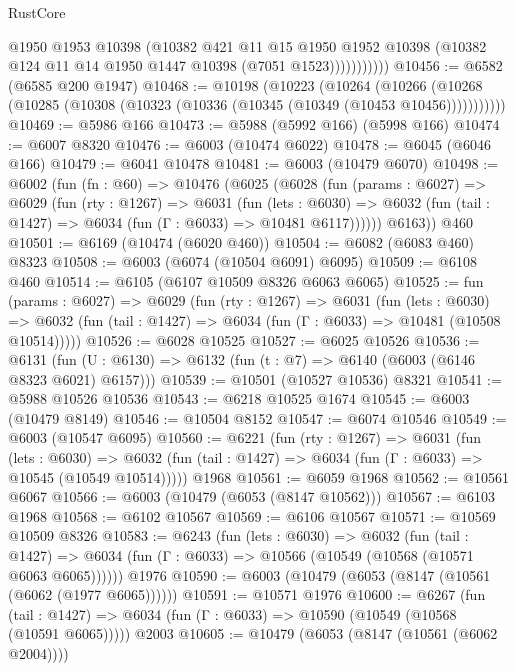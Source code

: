 \begin{lexlean}{RustCore}
\begin{coremodule}
{\begin{coremodule}
{{{{{{{{{{{{{{{{{{{{{{{{{{{{{{{{{{{{{{{{{{{{{{{                    @1950
                    @1953
                    @10398
                    (@10382
                      @421
                      @11
                      @15
                      @1950
                      @1952
                      @10398
                      (@10382 @124 @11 @14 @1950 @1447 @10398 (@7051 @1523)))))))))))
@10456 := @6582 (@6585 @200 @1947)
@10468 := @10198
    (@10223
      (@10264
        (@10266 (@10268 (@10285 (@10308 (@10323 (@10336 (@10345 (@10349 (@10453 @10456)))))))))))
@10469 := @5986 @166
@10473 := @5988 (@5992 @166) (@5998 @166)
@10474 := @6007 @8320
@10476 := @6003 (@10474 @6022)
@10478 := @6045 (@6046 @166)
@10479 := @6041 @10478
@10481 := @6003 (@10479 @6070)
@10498 := @6002
    (fun (fn : @60) =>
    @10476
      (@6025
        (@6028
          (fun (params : @6027) =>
          @6029
            (fun (rty : @1267) =>
            @6031
              (fun (lets : @6030) =>
              @6032 (fun (tail : @1427) => @6034 (fun (Γ : @6033) => @10481 @6117))))))
        @6163))
    @460
@10501 := @6169 (@10474 (@6020 @460))
@10504 := @6082 (@6083 @460) @8323
@10508 := @6003 (@6074 (@10504 @6091) @6095)
@10509 := @6108 @460
@10514 := @6105 (@6107 @10509 @8326 @6063 @6065)
@10525 := fun (params : @6027) =>
  @6029
    (fun (rty : @1267) =>
    @6031
      (fun (lets : @6030) =>
      @6032 (fun (tail : @1427) => @6034 (fun (Γ : @6033) => @10481 (@10508 @10514)))))
@10526 := @6028 @10525
@10527 := @6025 @10526
@10536 := @6131 (fun (U : @6130) => @6132 (fun (t : @7) => @6140 (@6003 (@6146 @8323 @6021) @6157)))
@10539 := @10501 (@10527 @10536) @8321
@10541 := @5988 @10526 @10536
@10543 := @6218 @10525 @1674
@10545 := @6003 (@10479 @8149)
@10546 := @10504 @8152
@10547 := @6074 @10546
@10549 := @6003 (@10547 @6095)
@10560 := @6221
    (fun (rty : @1267) =>
    @6031
      (fun (lets : @6030) =>
      @6032 (fun (tail : @1427) => @6034 (fun (Γ : @6033) => @10545 (@10549 @10514)))))
    @1968
@10561 := @6059 @1968
@10562 := @10561 @6067
@10566 := @6003 (@10479 (@6053 (@8147 @10562)))
@10567 := @6103 @1968
@10568 := @6102 @10567
@10569 := @6106 @10567
@10571 := @10569 @10509 @8326
@10583 := @6243
    (fun (lets : @6030) =>
    @6032
      (fun (tail : @1427) =>
      @6034 (fun (Γ : @6033) => @10566 (@10549 (@10568 (@10571 @6063 @6065))))))
    @1976
@10590 := @6003 (@10479 (@6053 (@8147 (@10561 (@6062 (@1977 @6065))))))
@10591 := @10571 @1976
@10600 := @6267
    (fun (tail : @1427) => @6034 (fun (Γ : @6033) => @10590 (@10549 (@10568 (@10591 @6065)))))
    @2003
@10605 := @10479 (@6053 (@8147 (@10561 (@6062 @2004))))
}}}}}}}}}}}}}}}}}}}}}}}}}}}}}}}}}}}}}}}}}}}}}}}
\end{coremodule}}
\end{coremodule}
\end{lexlean}
